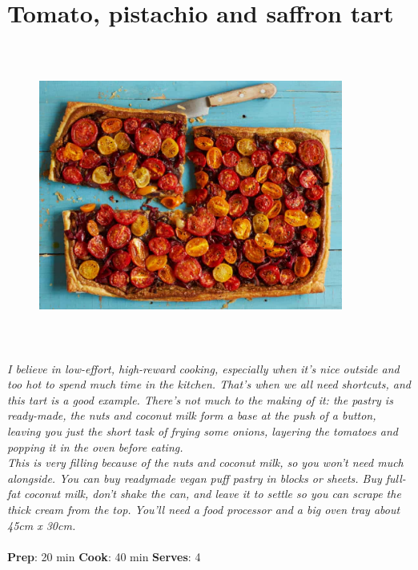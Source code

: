 \documentclass{book}
\begin{document}
\section{Tomato, pistachio and saffron tart}
\begin{figure}
\centering\includegraphics[width=10cm,height=10cm,keepaspectratio]{Recipe_Pictures/Tomato,_pistachio_and_saffron_tart.png}
\end{figure}
\emph{I believe in low-effort, high-reward cooking, especially when it’s nice outside and too hot to spend much time in the kitchen. That’s when we all need shortcuts, and this tart is a good example. There’s not much to the making of it: the pastry is ready-made, the nuts and coconut milk form a base at the push of a button, leaving you just the short task of frying some onions, layering the tomatoes and popping it in the oven before eating.\\ 
This is very filling because of the nuts and coconut milk, so you won’t need much alongside. You can buy readymade vegan puff pastry in blocks or sheets. Buy full-fat coconut milk, don’t shake the can, and leave it to settle so you can scrape the thick cream from the top. You’ll need a food processor and a big oven tray about 45cm x 30cm.}\\\\ 
\textbf{Prep}: 20 min
\textbf{Cook}: 40 min
\textbf{Serves}: 4
\end{document}
